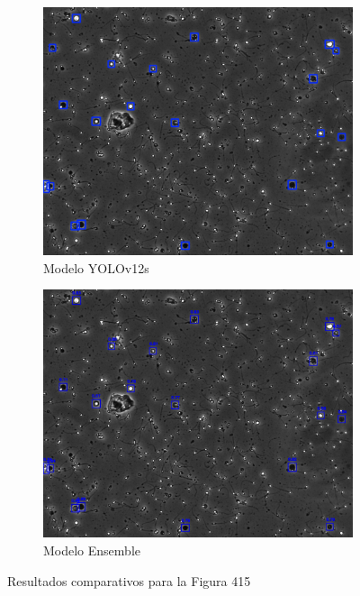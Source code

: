 \documentclass[12pt,a4paper,onecolumn,oneside]{report}
\begin{document}
\begin{figure}[H]
  \vspace{0.3cm} 
  
  \begin{subfigure}[b]{0.48\textwidth}
    \centering
    \includegraphics[width=\textwidth]{figuras/evaluacion_cualitativa/415/415_v12.jpg}
    \caption{Modelo YOLOv12s}
    \label{fig:yolov12s_image_415}
  \end{subfigure}
  \hfill
  \begin{subfigure}[b]{0.48\textwidth}
    \centering
    \includegraphics[width=\textwidth]{figuras/evaluacion_cualitativa/415/415_ensemble.jpg}
    \caption{Modelo Ensemble}
    \label{fig:ensemble_image_415}
  \end{subfigure}
  
  \caption{Resultados comparativos para la Figura 415}
  \label{fig:415}
\end{figure}
\end{document}
